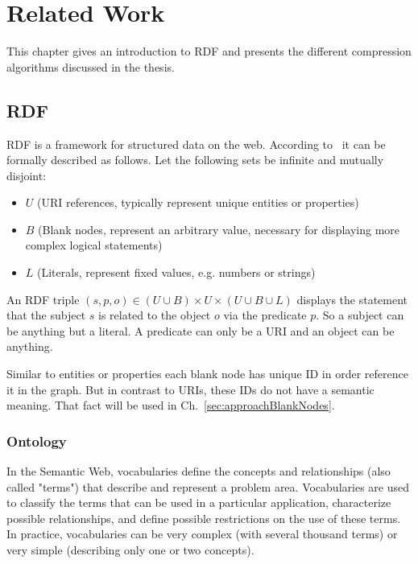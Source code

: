 \chapter{Related Work}\label{ch:related_work}

This chapter gives an introduction to RDF and presents the different compression algorithms discussed in the thesis.

\section{RDF}\label{sec:relatedworkRDF}

RDF is a framework for structured data on the web. According to~\cite{hitzler} it can be formally described as follows. Let the following sets be infinite and mutually disjoint:

\begin{itemize}
	\item $U$ (URI references, typically represent unique entities or properties)
	\item $B$ (Blank nodes, represent an arbitrary value, necessary for displaying more complex logical statements)
	\item $L$ (Literals, represent fixed values, e.g. numbers or strings)
\end{itemize}

An RDF triple $(s,p,o) \in (U \cup B) \times U \times (U\cup B \cup L)$ displays the statement that the subject $s$ is related to the object $o$ via the predicate $p$. So a subject can be anything but a literal. A predicate can only be a URI and an object can be anything.

Similar to entities or properties each blank node has unique ID in order reference it in the graph. But in contrast to URIs, these IDs do not have a semantic meaning. That fact will be used in Ch.~\ref{sec:approachBlankNodes}.

\subsection{Ontology}\label{sec:relatedworkOntology}
In the Semantic Web, vocabularies define the concepts and relationships (also called "terms") that describe and represent a problem area. Vocabularies are used to classify the terms that can be used in a particular application, characterize possible relationships, and define possible restrictions on the use of these terms. In practice, vocabularies can be very complex (with several thousand terms) or very simple (describing only one or two concepts).

